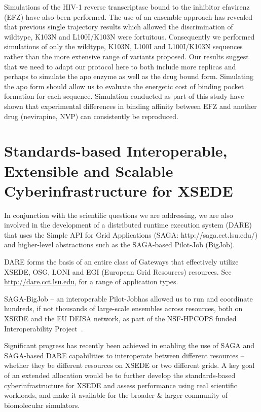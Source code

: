 \documentclass[a4paper,11pt]{article}
\begin{document}
Simulations of the HIV-1 reverse transcriptase bound to the inhibitor efavirenz (EFZ) have also been performed. The use of an ensemble approach has revealed that previous single trajectory results which allowed the discrimination of wildtype, K103N and L100I/K103N were fortuitous. Consequently we performed simulations of only the wildtype, K103N, L100I and L100I/K103N sequences rather than the more extensive range of variants proposed. Our results suggest that we need to adapt our protocol here to both include more replicas and perhaps to simulate the apo enzyme as well as the drug bound form.  Simulating the apo form should allow us to evaluate the energetic cost of binding pocket formation for each sequence. Simulation conducted as part of this study have shown that experimental differences in binding affinity between EFZ and another drug (nevirapine, NVP) can consistently be reproduced.




\section{ Standards-based Interoperable, Extensible and Scalable Cyberinfrastructure for XSEDE}
In conjunction with the scientific questions we are addressing, we are also involved in the development of a distributed runtime execution system (DARE) that uses the Simple API for Grid Applications (SAGA: http://saga.cct.lsu.edu/)
and higher-level abstractions such as the SAGA-based Pilot-Job (BigJob).

DARE forms the basis of an entire class of Gateways that effectively utilize XSEDE, OSG, LONI and EGI (European Grid Resources) resources. See \url{http://dare.cct.lsu.edu}, for a range of application types.

SAGA-BigJob -- an interoperable Pilot-Jobhas allowed us to run and coordinate hundreds, if not thousands of large-scale ensembles across resources, both on XSEDE and the EU DEISA network, as part of the NSF-HPCOPS funded Interoperability Project~\cite{tg-vph-interop}.  

Significant progress has recently been achieved in enabling the use of SAGA and SAGA-based DARE capabilities to interoperate between different resources -- whether they be different resources on XSEDE or two different grids.  A key goal of an extended allocation would be to further develop the standards-based cyberinfrastructure for XSEDE and assess performance using real scientific workloads, and make it available for the broader \& larger community of biomolecular simulators.

%



\end{document}
